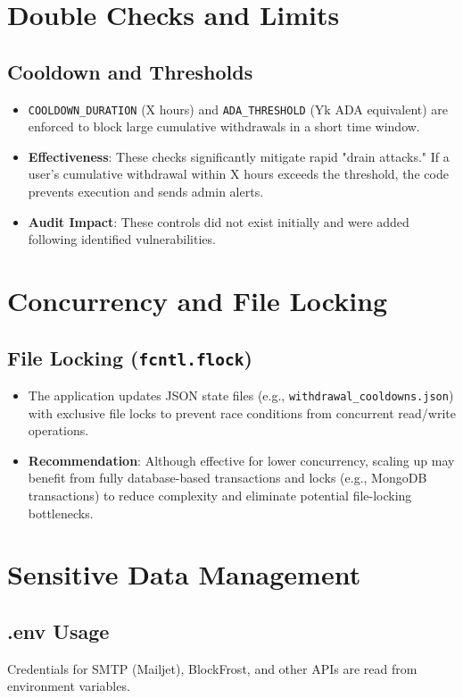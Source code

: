 \documentclass[11pt,a4paper]{report}
\begin{document}
\section{Double Checks and Limits}

\subsection{Cooldown and Thresholds}
\begin{itemize}
    \item \texttt{COOLDOWN\_DURATION} (X hours) and \texttt{ADA\_THRESHOLD} (Yk ADA equivalent) are enforced to block large cumulative withdrawals in a short time window.
    \item \textbf{Effectiveness}: These checks significantly mitigate rapid "drain attacks." If a user's cumulative withdrawal within X hours exceeds the threshold, the code prevents execution and sends admin alerts.
    \item \textbf{Audit Impact}: These controls did not exist initially and were added following identified vulnerabilities.
\end{itemize}

\section{Concurrency and File Locking}

\subsection{File Locking (\texttt{fcntl.flock})}
\begin{itemize}
    \item The application updates JSON state files (e.g., \texttt{withdrawal\_cooldowns.json}) with exclusive file locks to prevent race conditions from concurrent read/write operations.
    \item \textbf{Recommendation}: Although effective for lower concurrency, scaling up may benefit from fully database-based transactions and locks (e.g., MongoDB transactions) to reduce complexity and eliminate potential file-locking bottlenecks.
\end{itemize}

\section{Sensitive Data Management}

\subsection{.env Usage}
Credentials for SMTP (Mailjet), BlockFrost, and other APIs are read from environment variables.
\end{document}
